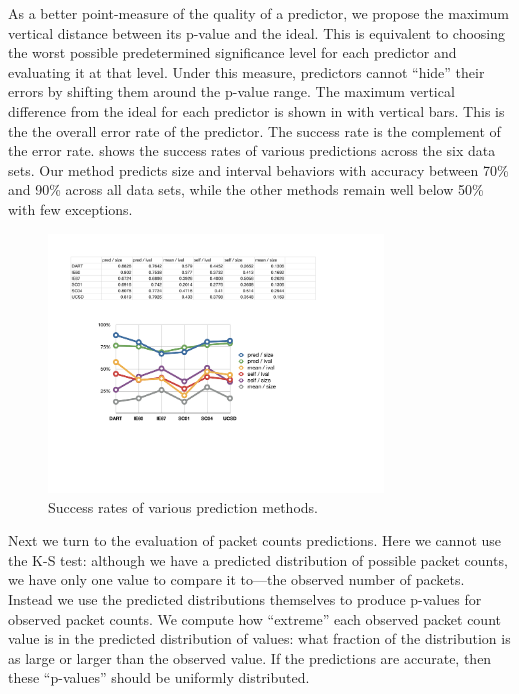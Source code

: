 \documentclass[conference]{IEEEtran}
\begin{document}
As a better point-measure of the quality of a predictor, we propose the maximum vertical distance between its p-value  and the ideal.
This is equivalent to choosing the worst possible predetermined significance level for each predictor and evaluating it at that level.
Under this measure, predictors cannot ``hide'' their errors by shifting them around the p-value range.
The maximum vertical difference from the ideal for each predictor is shown in  with vertical bars.
This is the the overall error rate of the predictor.
The success rate is the complement of the error rate.
 shows the success rates of various predictions across the six data sets.
Our method predicts size and interval behaviors with accuracy between 70\% and 90\% across all data sets, while the other methods remain well below 50\% with few exceptions.

\begin{figure}[b]
\vspace{-1em}
\begin{center}
\includegraphics[width=3.5in]{pred_stats}
\caption{Success rates of various prediction methods.}
\end{center}
\vspace{-0.9em}
\end{figure}

Next we turn to the evaluation of packet counts predictions.
Here we cannot use the K-S test:
although we have a predicted distribution of possible packet counts, we have only one value to compare it to---the observed number of packets.
Instead we use the predicted distributions themselves to produce p-values for observed packet counts.
We compute how ``extreme'' each observed packet count value is in the predicted distribution of values:
what fraction of the distribution is as large or larger than the observed value.
If the predictions are accurate, then these ``p-values'' should be uniformly distributed.
\end{document}
